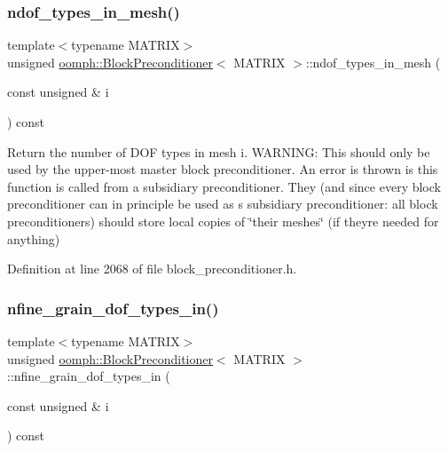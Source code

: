 \subsubsection{\texorpdfstring{ndof\+\_\+types\+\_\+in\+\_\+mesh()}{ndof\_types\_in\_mesh()}}
{\footnotesize\ttfamily template$<$typename M\+A\+T\+R\+IX$>$ \\
unsigned \hyperlink{classoomph_1_1BlockPreconditioner}{oomph\+::\+Block\+Preconditioner}$<$ M\+A\+T\+R\+IX $>$\+::ndof\+\_\+types\+\_\+in\+\_\+mesh (\begin{DoxyParamCaption}\item[{const unsigned \&}]{i }\end{DoxyParamCaption}) const\hspace{0.3cm}{\ttfamily [inline]}}



Return the number of D\+OF types in mesh i. W\+A\+R\+N\+I\+NG\+: This should only be used by the upper-\/most master block preconditioner. An error is thrown is this function is called from a subsidiary preconditioner. They (and since every block preconditioner can in principle be used as s subsidiary preconditioner\+: all block preconditioners) should store local copies of \char`\"{}their meshes\char`\"{} (if they\textquotesingle{}re needed for anything) 



Definition at line 2068 of file block\+\_\+preconditioner.\+h.

\mbox{\label{classoomph_1_1BlockPreconditioner_a50b76a374797805f64e2af34d581cdc2}} 
\subsubsection{\texorpdfstring{nfine\+\_\+grain\+\_\+dof\+\_\+types\+\_\+in()}{nfine\_grain\_dof\_types\_in()}}
{\footnotesize\ttfamily template$<$typename M\+A\+T\+R\+IX$>$ \\
unsigned \hyperlink{classoomph_1_1BlockPreconditioner}{oomph\+::\+Block\+Preconditioner}$<$ M\+A\+T\+R\+IX $>$\+::nfine\+\_\+grain\+\_\+dof\+\_\+types\+\_\+in (\begin{DoxyParamCaption}\item[{const unsigned \&}]{i }\end{DoxyParamCaption}) const\hspace{0.3cm}{\ttfamily [inline]}}



